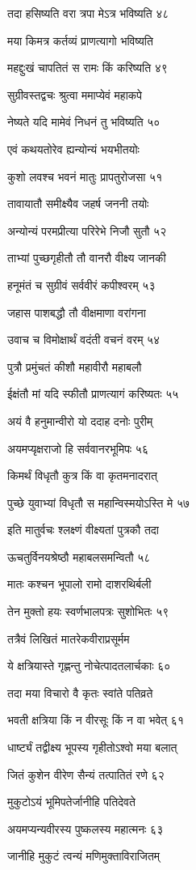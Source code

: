 तदा हसिष्यति वरा त्रपा मेऽत्र भविष्यति ४८

मया किमत्र कर्तव्यं प्राणत्यागो भविष्यति

महद्दुःखं चापतितं स रामः किं करिष्यति ४९

सुग्रीवस्तद्वचः श्रुत्वा ममाप्येवं महाकपे

नेष्यते यदि मामेवं निधनं तु भविष्यति ५०

एवं कथयतोरेव ह्यन्योन्यं भयभीतयोः

कुशो लवश्च भवनं मातुः प्रापतुरोजसा ५१

तावायातौ समीक्ष्यैव जहर्ष जननी तयोः

अन्योन्यं परमप्रीत्या परिरेभे निजौ सुतौ ५२

ताभ्यां पुच्छगृहीतौ तौ वानरौ वीक्ष्य जानकी

हनूमंतं च सुग्रीवं सर्ववीरं कपीश्वरम् ५३

जहास पाशबद्धौ तौ वीक्षमाणा वरांगना

उवाच च विमोक्षार्थं वदंती वचनं वरम् ५४

पुत्रौ प्रमुंचतं कीशौ महावीरौ महाबलौ

ईक्षंतौ मां यदि स्फीतौ प्राणत्यागं करिष्यतः ५५

अयं वै हनुमान्वीरो यो ददाह दनोः पुरीम्

अयमप्यृक्षराजो हि सर्ववानरभूमिपः ५६

किमर्थं विधृतौ कुत्र किं वा कृतमनादरात्

पुच्छे युवाभ्यां विधृतौ स महान्विस्मयोऽस्ति मे ५७

इति मातुर्वचः श्लक्ष्णं वीक्ष्यतां पुत्रकौ तदा

ऊचतुर्विनयश्रेष्ठौ महाबलसमन्वितौ ५८

मातः कश्चन भूपालो रामो दाशरथिर्बली

तेन मुक्तो हयः स्वर्णभालपत्रः सुशोभितः ५९

तत्रैवं लिखितं मातरेकवीराप्रसूर्मम

ये क्षत्रियास्ते गृह्णन्तु नोचेत्पादतलार्चकाः ६०

तदा मया विचारो वै कृतः स्वांते पतिव्रते

भवती क्षत्रिया किं न वीरसूः किं न वा भवेत् ६१

धार्ष्ट्यं तद्वीक्ष्य भूपस्य गृहीतोऽश्वो मया बलात्

जितं कुशेन वीरेण सैन्यं तत्पातितं रणे ६२

मुकुटोऽयं भूमिपतेर्जानीहि पतिदेवते

अयमप्यन्यवीरस्य पुष्कलस्य महात्मनः ६३

जानीहि मुकुटं त्वन्यं मणिमुक्ताविराजितम्

